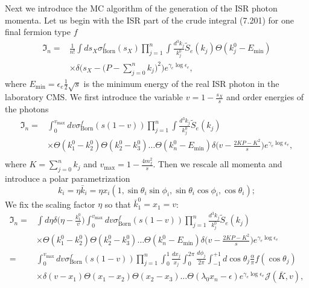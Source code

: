 Next we introduce the MC algorithm of the generation of the ISR photon momenta. Let us begin with the ISR part of the crude integral (7.201) for one final fermion type $f$
\begin{align}
\mathfrak{I}_n=&\frac{1}{n!}\int ds_X\sigma^f_\text{Born}(s_X)\prod_{j=1}^{n}\int\frac{d^3k_j}{k^0_j}\widetilde{S}_e(k_j)\Theta(k^0_j-E_\text{min})\nonumber\\
&\times\delta\biggl( s_X-\biggl( P-\sum_{j=0}^{n}k_j \biggr)^2 \biggr)e^{\gamma_e\log\epsilon_e},
\end{align}
where $E_\text{min}=\epsilon_e\frac{1}{2}\sqrt{s}$ is the minimum energy of the real ISR photon in the laboratory CMS. We first introduce the variable $v=1-\frac{s_X}{s}$ and order energies of the photons
\begin{align}
\mathfrak{I}_n=&\int_{0}^{v_\text{max}}dv\sigma^f_\text{Born}(s(1-v))\prod_{j=1}^{n}\int\frac{d^3k_j}{k^0_j}\widetilde{S}_e(k_j)\nonumber\\
&\times\Theta(k^0_1-k^0_2)\Theta(k^0_2-k^0_3)\ldots\Theta(k^0_n-E_\text{min})\delta\biggl(v-\frac{2KP-K^2}{s}\biggr)e^{\gamma_e\log\epsilon_e},\nonumber\\
\end{align}
where $K=\sum_{j=0}^{n}k_j$ and $v_\text{max}=1-\frac{4m^2_f}{s}$. Then we rescale all momenta and introduce a polar parametrization
\begin{equation}
k_i=\eta\bar{k}_i=\eta x_i(1,\sin\theta_i\sin\phi_i,\sin\theta_i\cos\phi_i,\cos\theta_i);
\end{equation}
We fix the scaling factor $\eta$ so that $\bar{k}^0_1=x_1=v$:
\begin{align}
\mathfrak{I}_n=&\int d\eta\delta\biggl(\eta-\frac{k^0_1}{v}\biggr)\int_{0}^{v_\text{max}}dv\sigma^f_\text{Born}(s(1-v))\prod_{j=1}^{n}\frac{d^3k_j}{k^0_j}\widetilde{S}_e(k_j)\nonumber\\
&\times\Theta(k^0_1-k^0_2)\Theta(k^0_2-k^0_3)\ldots\Theta(k^0_n-E_\text{min})\delta\biggl(v-\frac{2KP-K^2}{s}\biggr)e^{\gamma_e\log\epsilon_e}\nonumber\\
=&\int_{0}^{v_\text{max}}dv\sigma^f_\text{Born}(s(1-v))\prod_{j=1}^{n}\int_{0}^{1}\frac{dx_j}{x_j}\int_{0}^{2\pi}\frac{d\phi_j}{2\pi}\int_{-1}^{+1}d\cos\theta_j\frac{\alpha}{\pi}f(\cos\theta_j)\nonumber\\
&\times\delta(v-x_1)\Theta(x_1-x_2)\Theta(x_2-x_3)\ldots\Theta(\lambda_0x_n-\epsilon)e^{\gamma_e\log\epsilon_e}\mathcal{J}(\bar{K},v),\nonumber\\
\end{align}
